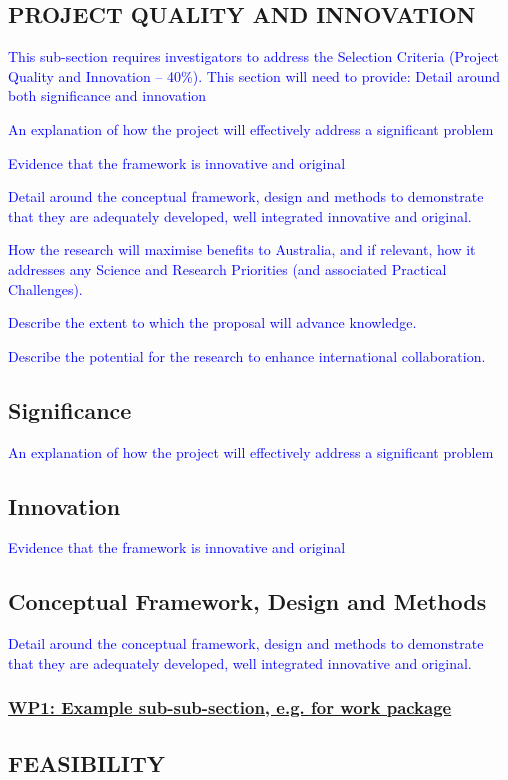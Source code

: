 \documentclass[12pt,a4paper]{article}
\newcommand{\rules}[1]{\textcolor{blue}{#1}}
\newcommand*{\TitleFont}{%
      \usefont{\encodingdefault}{\rmdefault}{b}{n}%
      \fontsize{12}{12}%
      \selectfont}
\begin{document}
\subsection*{\TitleFont PROJECT QUALITY AND INNOVATION}
\rules{This sub-section requires investigators to address the Selection Criteria (Project Quality and Innovation – 40\%). This section will need to provide: 
Detail around both significance and innovation}

\rules{An explanation of how the project will effectively address a significant problem}

\rules{Evidence that the framework is innovative and original}

\rules{Detail around the conceptual framework, design and methods to demonstrate that they are adequately developed, well integrated innovative and original.}

\rules{How the research will maximise benefits to Australia, and if relevant, how it addresses any Science and Research Priorities (and associated Practical Challenges).}

\rules{Describe the extent to which the proposal will advance knowledge.}

\rules{Describe the potential for the research to enhance international collaboration.}
\subsection*{Significance}
\rules{An explanation of how the project will effectively address a significant problem}
\subsection*{Innovation}
\rules{Evidence that the framework is innovative and original}
\subsection*{Conceptual Framework, Design and Methods}
\rules{Detail around the conceptual framework, design and methods to demonstrate that they are adequately developed, well integrated innovative and original.}
\subsubsection*{\underline{WP1: Example sub-sub-section, e.g. for work package}}

\subsection*{\TitleFont FEASIBILITY}
\end{document}
